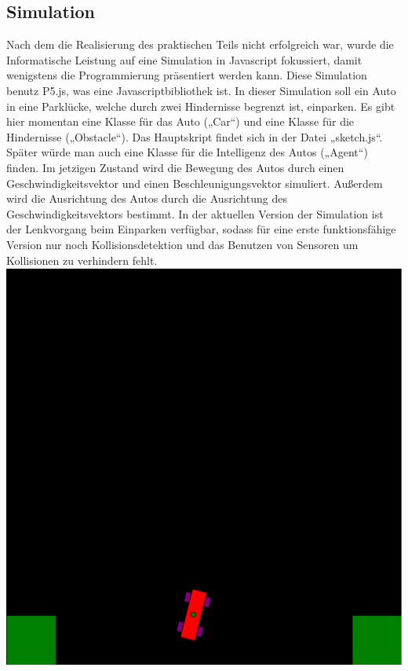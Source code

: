 \documentclass[notitlepage]{report}
\begin{document}
\subsection{Simulation}
Nach dem die Realisierung des praktischen Teils nicht erfolgreich war, wurde die Informatische Leistung auf eine Simulation in Javascript fokussiert, damit wenigstens die Programmierung pr\"{a}sentiert werden kann. Diese Simulation benutz P5.js, was eine Javascriptbibliothek ist. In dieser Simulation soll ein Auto in eine Parkl\"{u}cke, welche durch zwei Hindernisse begrenzt ist, einparken. Es gibt hier momentan eine Klasse f\"{u}r das Auto („Car“) und eine Klasse f\"{u}r die Hindernisse („Obstacle“). Das Hauptskript findet sich in der Datei „sketch.js“. Sp\"{a}ter w\"{u}rde man auch eine Klasse f\"{u}r die Intelligenz des Autos („Agent“) finden. Im jetzigen Zustand wird die Bewegung des Autos durch einen Geschwindigkeitsvektor und einen Beschleunigungsvektor simuliert. Au{\ss}erdem wird die Ausrichtung des Autos durch die Ausrichtung des Geschwindigkeitsvektors bestimmt. In der aktuellen Version der Simulation ist der Lenkvorgang beim Einparken verf\"{u}gbar, sodass f\"{u}r eine erste funktionsf\"{a}hige Version nur noch Kollisionsdetektion und das Benutzen von Sensoren um Kollisionen zu verhindern fehlt.     
\includegraphics[scale=0.5]{Bild_Simulation.png}
\end{document}
